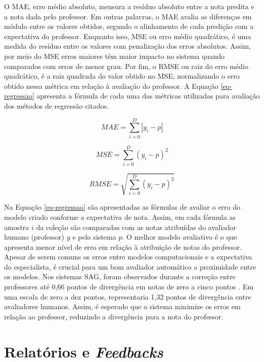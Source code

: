 O MAE, erro médio absoluto, mensura a resíduo absoluto entre a nota predita e a nota dada pelo professor. Em outras palavras, o MAE avalia as diferenças em módulo entre os valores obtidos, segundo o alinhamento de cada predição com a expectativa do professor. Enquanto isso, MSE ou erro médio quadrático, é uma medida do resíduo entre os valores com penalização dos erros absolutos. Assim, por meio do MSE erros maiores têm maior impacto no sistema quando comparados com erros de menor grau. Por fim, o RMSE ou raiz do erro médio quadrático, é a raiz quadrada do valor obtido no MSE, normalizando o erro obtido nessa métrica em relação à avaliação do professor. A Equação \ref{eq-regressao} apresenta a fórmula de cada uma das métricas utilizadas para avaliação dos métodos de regressão citados.

\begin{equation}
MAE = \sum_{i=0}^{D}|y_i-p|
\label{eq-regressao}
\end{equation}

\begin{equation*}
MSE = \sum_{i=0}^{D}(y_i-p)^2
\end{equation*}

\begin{equation*}
RMSE = \sqrt{\sum_{i=0}^{D}(y_i-p)^2}
\end{equation*}

Na Equação \ref{eq-regressao} são apresentadas as fórmulas de avaliar o erro do modelo criado conforme a expectativa de nota. Assim, em cada fórmula as amostra $ i $ da coleção são comparadas com as notas atribuídas do avaliador humano (professor) $ y $ e pelo sistema $ p $. O melhor modelo avaliativo é o que apresenta menor nível de erro em relação à atribuição de notas do professor. Apesar de serem comuns os erros entre modelos computacionais e a expectativa do especialista, é crucial para um bom avaliador automático a proximidade entre os modelos. Nos sistemas SAG, foram observados durante a correção entre professores até 0,66 pontos de divergência em notas de zero a cinco pontos \cite{mohler2011}. Em uma escala de zero a dez pontos, representaria 1,32 pontos de divergência entre avaliadores humanos. Assim, é esperado que o sistema minimize os erros em relação ao professor, reduzindo a divergência para a nota do professor.


\section{Relatórios e \textit{Feedbacks}}
\label{sec-relatorios}


